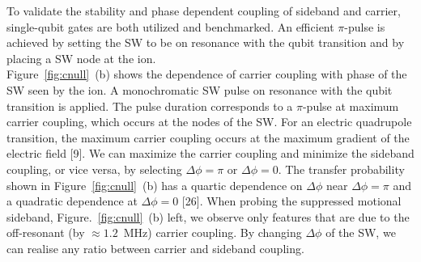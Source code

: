 \documentclass[12pt]{iopart}
\begin{document}
    To validate the stability and phase dependent coupling of sideband
    and carrier, single-qubit gates are both utilized and
    benchmarked. An efficient $\pi$-pulse is achieved by setting the
    SW to be on resonance with the qubit transition and by placing a
    SW node at the ion.\\

    Figure~\ref{fig:cnull}~(b) shows the dependence of carrier coupling with phase of
    the SW seen by the ion. A monochromatic SW pulse on resonance with
    the qubit transition is applied. The pulse duration corresponds to
    a $\pi$-pulse at maximum carrier coupling, which occurs at the nodes
    of the SW. For an electric quadrupole transition, the maximum
    carrier coupling occurs at the maximum gradient of the electric
    field [9]. We can maximize the carrier coupling and minimize the
    sideband coupling, or vice versa, by selecting $\Delta\phi = \pi$ or $\Delta\phi = 0$.
    The transfer probability shown in Figure~\ref{fig:cnull}~(b) has a
    quartic dependence on $\Delta\phi$ near $\Delta\phi = \pi$ and a quadratic dependence at
    $\Delta\phi = 0$ [26]. When probing the suppressed motional sideband,
    Figure.~\ref{fig:cnull}~(b) left, we observe only features that are due to the
    off-resonant (by $\approx 1.2$~MHz) carrier coupling. By changing $\Delta\phi$ of
    the SW, we can realise any ratio between carrier and sideband
    coupling.\\
\end{document}

